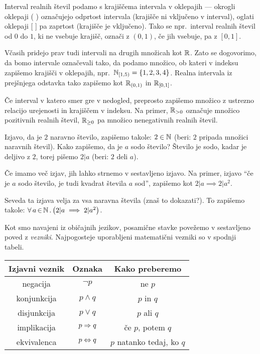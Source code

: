 		Interval realnih števil podamo s krajiščema intervala v oklepajih --- okrogli oklepaji ( ) označujejo odprtost intervala (krajišče ni vključeno v interval), oglati oklepaji [ ] pa zaprtost (krajišče je vključeno). Tako se npr.~interval realnih števil od $0$ do $1$, ki ne vsebuje krajišč, označi z $(0, 1)$, če jih vsebuje, pa z $[0, 1]$.
		
		Včasih pridejo prav tudi intervali na drugih množicah kot $\mathbb{R}$. Zato se dogovorimo, da bomo intervale označevali tako, da podamo množico, ob kateri v indeksu zapišemo krajišči v oklepajih, npr.~$\intco[\NN]{1}{5} = \set{1, 2, 3, 4}$. Realna intervala iz prejšnjega odstavka tako zapišemo kot ${\mathbb{R}}_{(0, 1)}$ in ${\mathbb{R}}_{[0, 1]}$.
		
		Če interval v katero smer gre v nedogled, preprosto zapišemo množico z ustrezno relacijo urejenosti in krajiščem v indeksu. Na primer, $\mathbb{R}_{> 0}$ označuje množico pozitivnih realnih števil, $\mathbb{R}_{\geq 0}$ pa množico nenegativnih realnih števil.
		
		
		Izjavo, da je $2$ naravno število, zapišemo takole: $2 \in \mathbb{N}$ (beri: $2$ pripada množici naravnih števil). Kako zapišemo, da je $a$ sodo število? Število je sodo, kadar je deljivo z $2$, torej pišemo $2 | a$ (beri: $2$ deli $a$).
		
		Če imamo več izjav, jih lahko strnemo v sestavljeno izjavo. Na primer, izjavo "`če je $a$ sodo število, je tudi kvadrat števila $a$ sod"', zapišemo kot $2 | a \implies 2 | a^2$.
		
		Seveda ta izjava velja za vsa naravna števila (znaš to dokazati?). To zapišemo takole: $\all{a}{\NN}{2 | a \implies 2 | a^2}$.
		
		Kot smo navajeni iz običajnih jezikov, posamične stavke povežemo v sestavljeno poved z \emph{vezniki}. Najpogosteje uporabljeni matematični vezniki so v spodnji tabeli.
		
		\begin{tabular}{|ccc|}
			\hline
			\textbf{Izjavni veznik} & \textbf{Oznaka} & \textbf{Kako preberemo} \\
			\hline
			negacija & $\lnot{p}$ & ne $p$ \\
			konjunkcija & $p \land q$ & $p$ in $q$ \\
			disjunkcija & $p \lor q$ & $p$ ali $q$ \\
			implikacija & $p \Rightarrow q$ & če $p$, potem $q$ \\
			ekvivalenca & $p \Leftrightarrow q$ & $p$ natanko tedaj, ko $q$ \\
			\hline
		\end{tabular}
		
